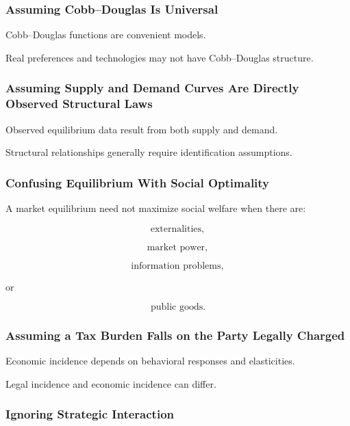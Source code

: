 \subsubsection{Assuming Cobb--Douglas Is Universal}

Cobb--Douglas functions are convenient models.

Real preferences and technologies may not have Cobb--Douglas structure.

\subsubsection{Assuming Supply and Demand Curves Are Directly Observed Structural Laws}

Observed equilibrium data result from both supply and demand.

Structural relationships generally require identification assumptions.

\subsubsection{Confusing Equilibrium With Social Optimality}

A market equilibrium need not maximize social welfare when there are:

\[
\boxed{
\text{externalities},
}
\]

\[
\boxed{
\text{market power},
}
\]

\[
\boxed{
\text{information problems},
}
\]

or

\[
\boxed{
\text{public goods}.
}
\]

\subsubsection{Assuming a Tax Burden Falls on the Party Legally Charged}

Economic incidence depends on behavioral responses and elasticities.

Legal incidence and economic incidence can differ.

\subsubsection{Ignoring Strategic Interaction}

